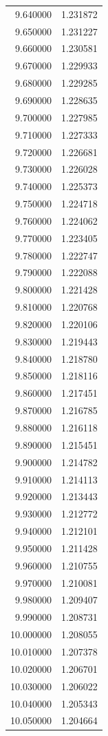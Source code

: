 \begin{tabular}{rr}
9.640000 & 1.231872 \\
9.650000 & 1.231227 \\
9.660000 & 1.230581 \\
9.670000 & 1.229933 \\
9.680000 & 1.229285 \\
9.690000 & 1.228635 \\
9.700000 & 1.227985 \\
9.710000 & 1.227333 \\
9.720000 & 1.226681 \\
9.730000 & 1.226028 \\
9.740000 & 1.225373 \\
9.750000 & 1.224718 \\
9.760000 & 1.224062 \\
9.770000 & 1.223405 \\
9.780000 & 1.222747 \\
9.790000 & 1.222088 \\
9.800000 & 1.221428 \\
9.810000 & 1.220768 \\
9.820000 & 1.220106 \\
9.830000 & 1.219443 \\
9.840000 & 1.218780 \\
9.850000 & 1.218116 \\
9.860000 & 1.217451 \\
9.870000 & 1.216785 \\
9.880000 & 1.216118 \\
9.890000 & 1.215451 \\
9.900000 & 1.214782 \\
9.910000 & 1.214113 \\
9.920000 & 1.213443 \\
9.930000 & 1.212772 \\
9.940000 & 1.212101 \\
9.950000 & 1.211428 \\
9.960000 & 1.210755 \\
9.970000 & 1.210081 \\
9.980000 & 1.209407 \\
9.990000 & 1.208731 \\
10.000000 & 1.208055 \\
10.010000 & 1.207378 \\
10.020000 & 1.206701 \\
10.030000 & 1.206022 \\
10.040000 & 1.205343 \\
10.050000 & 1.204664 \\

\end{tabular}

